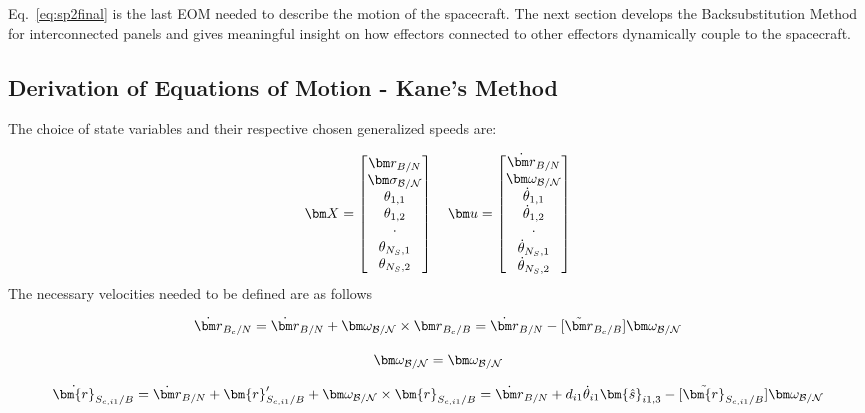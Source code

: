 Eq.~\eqref{eq:sp2final} is the last EOM needed to describe the motion of the spacecraft. The next section develops the Backsubstitution Method for interconnected panels and gives meaningful insight on how effectors connected to other effectors dynamically couple to the spacecraft.

\subsection{Derivation of Equations of Motion - Kane's Method}

The choice of state variables and their respective chosen generalized speeds are:

\begin{equation}
	\bm X =
	\begin{bmatrix}
		\bm r_{B/N}\\
		\bm \sigma_{\cal{B/N}}\\
		\theta_{1,1}\\
		\theta_{1,2}\\
		\cdot\\
		\theta_{N_S,1}\\
		\theta_{N_S,2}
	\end{bmatrix}
	\quad
	\bm u = \begin{bmatrix}
		\dot{\bm r}_{B/N}\\
		\bm \omega_{\cal{B/N}}\\
		\dot{\theta}_{1,1}\\
		\dot{\theta}_{1,2}\\
		\cdot\\
		\dot{\theta}_{N_S,1}\\
		\dot{\theta}_{N_S,2}
	\end{bmatrix}
\end{equation}
The necessary velocities needed to be defined are as follows

\begin{equation}
	\dot{\bm r}_{B_c/N} = \dot{\bm r}_{B/N} + \bm \omega_{\cal{B/N}} \times {\bm r}_{B_c/B} = \dot{\bm r}_{B/N}  - [\tilde{{\bm r}}_{B_c/B}] \bm \omega_{\cal{B/N}} \\
\end{equation}

\begin{equation}
	\bm \omega_{\cal{B/N}} = \bm \omega_{\cal{B/N}}
\end{equation}

\begin{equation}
	\dot{\bm{r}}_{S_{c,{i1}}/B} = \dot{\bm r}_{B/N} + \bm{r}'_{S_{c,{i1}}/B} + \bm \omega_{\cal{B/N}} \times \bm{r}_{S_{c,{i1}}/B} = \dot{\bm r}_{B/N} + d_{i1} \dot{\theta}_{i1} \bm{\hat{s}}_{i1,3}  - [\tilde{\bm{r}}_{S_{c,{i1}}/B}] \bm \omega_{\cal{B/N}}
\end{equation}

